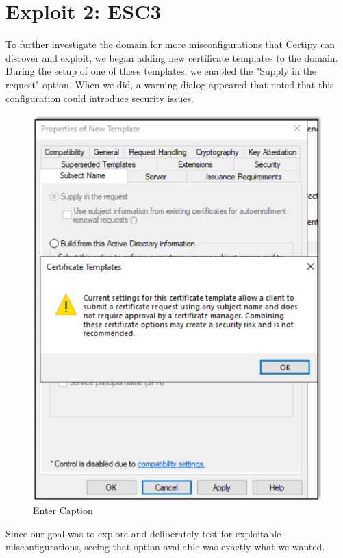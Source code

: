 \section{Exploit 2: ESC3}
To further investigate the domain for more misconfigurations that Certipy can discover and exploit, we began adding new certificate templates to the domain. During the setup of one of these templates, we enabled the "Supply in the request" option. When we did, a warning dialog appeared that noted that this configuration could introduce security issues.
\begin{figure}
    \centering
    \includegraphics[width=0.75\linewidth]{certtemp.png}
    \caption{Enter Caption}
    \label{fig:placeholder}
\end{figure}
Since our goal was to explore and deliberately test for exploitable misconfigurations, seeing that option available was exactly what we wanted.


